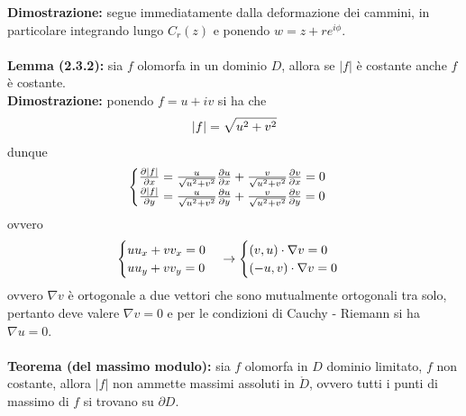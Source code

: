 \documentclass{article}
\begin{document}
\textbf{Dimostrazione:} segue immediatamente dalla deformazione dei cammini, in particolare integrando lungo $C_r(z)$ e ponendo $w = z + re^{i\phi}$. \\ \\
\textbf{Lemma (2.3.2):} sia $f$ olomorfa in un dominio $D$, allora se $|f|$ è costante anche $f$ è costante. \\

\textbf{Dimostrazione:} ponendo $f = u + iv$ si ha che
\begin{gather}
    |f| = \sqrt{u^2 + v^2} \notag
\end{gather}
dunque
\begin{gather}
    \begin{cases}
        \frac{\partial|f|}{\partial x} = \frac{u}{\sqrt{u^2 + v^2}}\frac{\partial u}{\partial x} + \frac{v}{\sqrt{u^2 + v^2}}\frac{\partial v}{\partial x} = 0 \\
        \frac{\partial|f|}{\partial y} = \frac{u}{\sqrt{u^2 + v^2}}\frac{\partial u}{\partial y} + \frac{v}{\sqrt{u^2 + v^2}}\frac{\partial v}{\partial y} = 0
    \end{cases} \notag
\end{gather}
ovvero
\begin{gather}
    \begin{cases}
        uu_x + vv_x = 0 \\
        uu_y + vv_y = 0
    \end{cases} \rightarrow
    \begin{cases}
        (v, u) \cdot \nabla v = 0 \\
        (-u, v) \cdot \nabla v = 0
    \end{cases} \notag
\end{gather}
ovvero $\nabla v$ è ortogonale a due vettori che sono mutualmente ortogonali tra solo, pertanto deve valere $\nabla v = 0$ e per le condizioni di Cauchy - Riemann si ha $\nabla u = 0$. \\ \\
\textbf{Teorema (del massimo modulo):} sia $f$ olomorfa in $D$ dominio limitato, $f$ non costante, allora $|f|$ non ammette massimi assoluti in $\mathring{D}$, ovvero tutti i punti di massimo di $f$ si trovano su $\partial D$. \\
\end{document}
